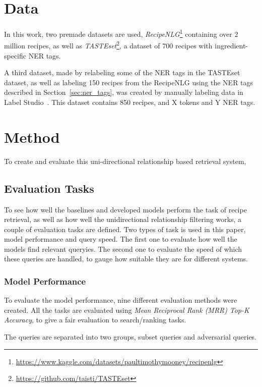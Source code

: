 \documentclass[11pt]{article}
\begin{document}
\section{Data}
In this work, two premade datasets are used,
\emph{RecipeNLG}\footnote{\url{https://www.kaggle.com/datasets/paultimothymooney/recipenlg}}
containing over 2 million recipes, as well as
\emph{TASTEset}\footnote{\url{https://github.com/taisti/TASTEset}}, a dataset of
700 recipes with ingredient-specific NER tags.

A third dataset, made by relabeling some of the NER tags in the TASTEset dataset,
as well as labeling 150 recipes from the RecipeNLG using the NER tags
described in Section~\ref{sec:ner_tags}, was created by manually labeling
data in Label Studio~\cite{LabelStudio}.
This dataset contains 850 recipes, and X tokens and Y NER tags.

\section{Method}
To create and evaluate this uni-directional relationship based retrieval system, 

\subsection{Evaluation Tasks}
To see how well the baselines and developed models perform the task of recipe
retrieval, as well as how well the unidirectional relationship filtering works,
a couple of evaluation tasks are defined.
Two types of task is used in this paper, model performance and query speed.
The first one to evaluate how well the models find relevant queryies.
The second one to evaluate the speed of which these queries are handled, to
gauge how suitable they are for different systems.

\subsubsection{Model Performance}\label{sec:modelperfomance}
To evaluate the model performance, nine different evaluation methods were
created.
All the tasks are evaluated using \emph{Mean Reciprocal Rank (MRR)} \emph{Top-K
Accuracy}, to give a fair evaluation to search/ranking tasks.

The queries are separated into two groups, subset queries and adversarial
queries.
\end{document}
